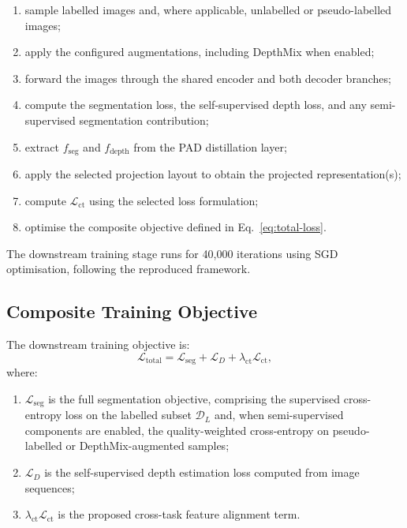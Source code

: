\begin{enumerate}
    \item sample labelled images and, where applicable, unlabelled or
    pseudo-labelled images;
    \item apply the configured augmentations, including DepthMix when
    enabled;
    \item forward the images through the shared encoder and both decoder
    branches;
    \item compute the segmentation loss, the self-supervised depth loss,
    and any semi-supervised segmentation contribution;
    \item extract $f_\text{seg}$ and $f_\text{depth}$ from the PAD
    distillation layer;
    \item apply the selected projection layout to obtain the projected
    representation(s);
    \item compute $\mathcal{L}_\text{ct}$ using the selected loss
    formulation;
    \item optimise the composite objective defined in
    Eq.~\ref{eq:total-loss}.
\end{enumerate}

The downstream training stage runs for 40,000 iterations using SGD
optimisation, following the reproduced framework.

\subsection{Composite Training Objective}
\label{sec:composite-objective}

The downstream training objective is:
\begin{equation}
    \mathcal{L}_\text{total}
    =
    \mathcal{L}_\text{seg}
    +
    \mathcal{L}_D
    +
    \lambda_\text{ct}\mathcal{L}_\text{ct},
    \label{eq:total-loss}
\end{equation}
where:
\begin{enumerate}
    \item $\mathcal{L}_\text{seg}$ is the full segmentation objective,
    comprising the supervised cross-entropy loss on the labelled subset
    $\mathcal{D}_L$ and, when semi-supervised components are enabled,
    the quality-weighted cross-entropy on pseudo-labelled or
    DepthMix-augmented samples;
    \item $\mathcal{L}_D$ is the self-supervised depth estimation loss
    computed from image sequences;
    \item $\lambda_\text{ct}\mathcal{L}_\text{ct}$ is the proposed
    cross-task feature alignment term.
\end{enumerate}

